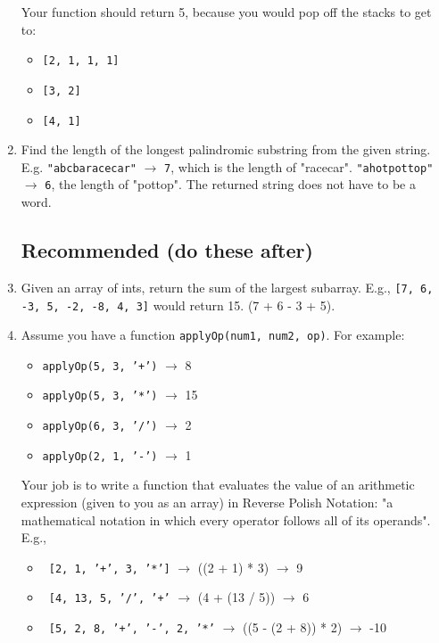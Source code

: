 \documentclass{article}
\begin{document}
\begin{enumerate}
Your function should return 5, because you would pop off the stacks to get to:

\begin{itemize}
  \item \texttt{[2, 1, 1, 1]}
  \item \texttt{[3, 2]}
  \item \texttt{[4, 1]}
\end{itemize}

\item Find the length of the longest palindromic substring from the given string. E.g. \texttt{"abcbaracecar"} $\rightarrow$ \texttt{7}, which is the length of "racecar". \texttt{"ahotpottop"} $\rightarrow$ \texttt{6}, the length of "pottop". The returned string does not have to be a word.

\subsection*{Recommended (do these after)}

\item Given an array of ints, return the sum of the largest subarray. E.g., \texttt{[7, 6, -3, 5, -2, -8, 4, 3]} would return 15. (7 + 6 - 3 + 5).

\item Assume you have a function \texttt{applyOp(num1, num2, op)}. For example: %

\begin{itemize}

    \item \texttt{applyOp(5, 3, '+')} $\rightarrow$ 8
    \item \texttt{applyOp(5, 3, '*')} $\rightarrow$ 15
    \item \texttt{applyOp(6, 3, '/')} $\rightarrow$ 2
    \item \texttt{applyOp(2, 1, '-')} $\rightarrow$ 1


\end{itemize}

Your job is to write a function that evaluates the value of an arithmetic expression (given to you as an array) in Reverse Polish Notation: "a mathematical notation in which every operator follows all of its operands". E.g.,

\begin{itemize}

    \item \texttt{ [2, 1, '+', 3, '*']} $\rightarrow$ ((2 + 1) * 3) $\rightarrow$ 9
    \item \texttt{ [4, 13, 5, '/', '+'} $\rightarrow$ (4 + (13 / 5)) $\rightarrow$ 6
    \item \texttt{ [5, 2, 8, '+', '-', 2, '*'} $\rightarrow$ ((5 - (2 + 8)) * 2) $\rightarrow$ -10


\end{itemize}
\end{enumerate}
\end{document}
